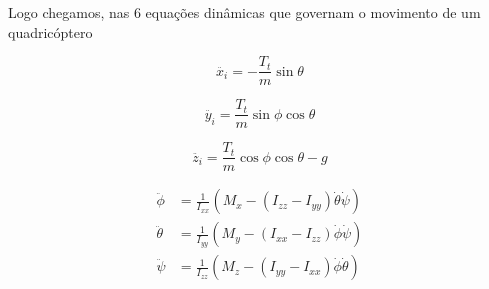 Logo chegamos, nas 6 equações dinâmicas que governam o movimento de um quadricóptero


\begin{equation}
\ddot{x_i} = -\frac{T_t}{m} \sin\theta
\end{equation}

\begin{equation}
\ddot{y_i} = \frac{T_t}{m} \sin\phi \cos\theta
\end{equation}

\begin{equation}
\ddot{z_i} = \frac{T_t}{m} \cos\phi \cos\theta - g
\end{equation}


\begin{align*}
	\ddot{\phi} &= \frac{1}{I_{xx}} \left( M_x - (I_{zz} - I_{yy}) \dot{\theta} \dot{\psi} \right) \\
	\ddot{\theta} &= \frac{1}{I_{yy}} \left( M_y - (I_{xx} - I_{zz}) \dot{\phi} \dot{\psi} \right) \\
	\ddot{\psi} &= \frac{1}{I_{zz}} \left( M_z - (I_{yy} - I_{xx}) \dot{\phi} \dot{\theta} \right)
\end{align*}
